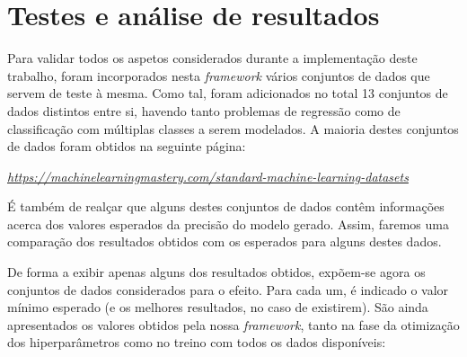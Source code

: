 \documentclass[a4paper]{report}
\begin{document}
\chapter{Testes e análise de resultados} \label{ch:Test&Analysis}
\large{
	Para validar todos os aspetos considerados durante a implementação deste trabalho, foram incorporados nesta \textit{framework} vários conjuntos de dados que servem de teste à mesma.
	Como tal, foram adicionados no total 13 conjuntos de dados distintos entre si, havendo tanto problemas de regressão como de classificação com múltiplas classes a serem modelados.
	A maioria destes conjuntos de dados foram obtidos na seguinte página:
	\begin{center}
        \textit{\url{https://machinelearningmastery.com/standard-machine-learning-datasets}}
	\end{center}

	É também de realçar que alguns destes conjuntos de dados contêm informações acerca dos valores esperados da precisão do modelo gerado.
	Assim, faremos uma comparação dos resultados obtidos com os esperados para alguns destes dados.

	De forma a exibir apenas alguns dos resultados obtidos, expõem-se agora os conjuntos de dados considerados para o efeito.
	Para cada um, é indicado o valor mínimo esperado (e os melhores resultados, no caso de existirem).
	São ainda apresentados os valores obtidos pela nossa \textit{framework}, tanto na fase da otimização dos hiperparâmetros como no treino com todos os dados disponíveis:
	
}
\end{document}
